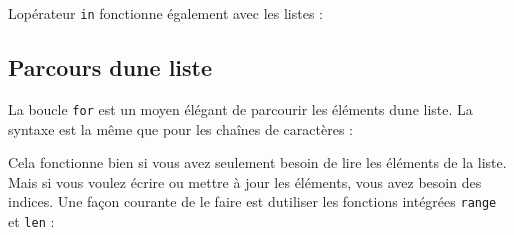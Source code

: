 L\textquotesingle opérateur \texttt{in} fonctionne également avec les
listes :

\begin{Shaded}
\begin{Highlighting}[]
\OperatorTok{\textgreater{}\textgreater{}\textgreater{}}\OperatorTok{=}\NormalTok{ [}\NormalTok{, }\NormalTok{, }\NormalTok{]}
\OperatorTok{\textgreater{}\textgreater{}\textgreater{}}  
\OperatorTok{\textgreater{}\textgreater{}\textgreater{}}  
\end{Highlighting}
\end{Shaded}

\hypertarget{parcours-dune-liste}{%
\subsection{Parcours d\textquotesingle une
liste}\label{parcours-dune-liste}}

La boucle \texttt{for} est un moyen élégant de parcourir les éléments
d\textquotesingle une liste. La syntaxe est la même que pour les chaînes
de caractères :

\begin{Shaded}
\begin{Highlighting}[]
\end{Highlighting}
\end{Shaded}

Cela fonctionne bien si vous avez seulement besoin de lire les éléments
de la liste. Mais si vous voulez écrire ou mettre à jour les éléments,
vous avez besoin des indices. Une façon courante de le faire est
d\textquotesingle utiliser les fonctions intégrées \texttt{range} et
\texttt{len} :

\begin{Shaded}
\begin{Highlighting}[]
 \NormalTok{(}
\OperatorTok{=}\OperatorTok{*} 
\end{Highlighting}
\end{Shaded}

